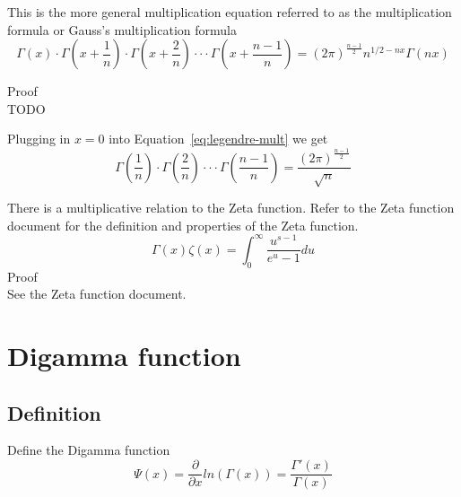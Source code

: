 \documentclass[a4paper]{article}
\begin{document}
    \begin{theorem}
        This is the more general multiplication equation referred to as the multiplication formula or Gauss's multiplication formula
        \begin{equation}
            \label{eq:legendre-mult}
            \boxed{
                \Gamma(x) \cdot \Gamma(x+\frac{1}{n}) \cdot \Gamma(x+\frac{2}{n}) \cdot \cdot \cdot \Gamma(x+\frac{n-1}{n}) = (2 \pi)^{\frac{n-1}{2}} n^{1/2 - nx} \Gamma(nx)
            }
        \end{equation}

        Proof
        \\
        TODO
    \end{theorem}

    Plugging in $x=0$ into Equation~\ref{eq:legendre-mult} we get
    \begin{equation}
        \Gamma(\frac{1}{n}) \cdot \Gamma(\frac{2}{n}) \cdot \cdot \cdot \Gamma(\frac{n-1}{n}) = \frac{(2 \pi)^{\frac{n-1}{2}}}{\sqrt{n}} \label{eq:equation10}
    \end{equation}


    \begin{theorem}
        There is a multiplicative relation to the Zeta function.
        Refer to the Zeta function document for the definition and properties of the Zeta function.
        \begin{equation}
            \boxed{
                \Gamma(x) \zeta(x) = \int_{0}^{\infty} \frac{u^{s-1}}{e^{u} - 1} du} \label{eq:equation11}
        \end{equation}
        Proof
        \\
        See the Zeta function document.
    \end{theorem}


    \section{Digamma function}\label{sec:digamma-function}

    \subsection{Definition}\label{subsec:definition}
    Define the Digamma function
    \begin{equation}
        \label{eq:digamma-def}
        \Psi(x) = \frac{\partial}{\partial x}  ln(\Gamma(x)) = \frac{\Gamma'(x)}{\Gamma(x)}
    \end{equation}
\end{document}
